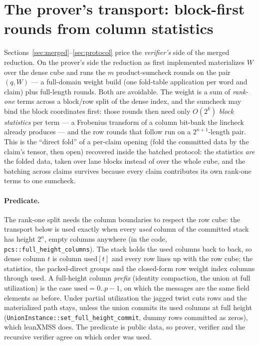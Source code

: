 \documentclass[11pt]{article}
\begin{document}
\section{The prover's transport: block-first rounds from column
statistics}\label{sec:blockfirst}

Sections~\ref{sec:merged}--\ref{sec:protocol} price the
\emph{verifier's} side of the merged reduction. On the prover's side
the reduction as first implemented materializes $W$ over the dense cube
and runs the $m$ product-sumcheck rounds on the pair $(q, W)$ --- a
full-domain weight build (one fold-table application per word and
claim) plus full-length rounds. Both are avoidable. The weight is a sum of
\emph{rank-one} terms across a block/row split of the dense index, and
the sumcheck may bind the block coordinates first: those rounds then
need only $O(2^{k})$ \emph{block statistics} per term --- a Frobenius
transform of a column bit-bank the lincheck already produces --- and
the row rounds that follow run on a $2^{n+1}$-length pair. This is the
``direct fold'' of a per-claim opening (fold the committed data by the
claim's tensor, then open) recovered inside the batched protocol: the
statistics \emph{are} the folded data, taken over lane blocks instead of
over the whole cube, and the batching across claims survives because
every claim contributes its own rank-one terms to one sumcheck.

\paragraph{Predicate.} The rank-one split needs the column boundaries
to respect the row cube: the transport below is used exactly when every
\emph{used} column of the committed stack has height $2^{n}$, empty
columns anywhere (in the code, \texttt{pcs::full\_height\_columns}).
The stack holds the used columns back to back, so dense column $t$ is
column $\mathrm{used}[t]$ and every row lines up with the row cube; the
statistics, the packed-direct groups and the closed-form row weight
index columns through $\mathrm{used}$. A full-height column
\emph{prefix} (identity compaction, the union at full utilization) is
the case $\mathrm{used} = 0..p{-}1$, on which the messages are the same
field elements as before. Under partial utilization the jagged twist
cuts rows and the materialized path stays, unless the union commits its
used columns at full height (\texttt{UnionInstance::set\_full\_height\_commit},
dummy rows committed as zeros), which leanXMSS does. The predicate is
public data, so prover, verifier and the recursive verifier agree on
which order was used.
\end{document}
